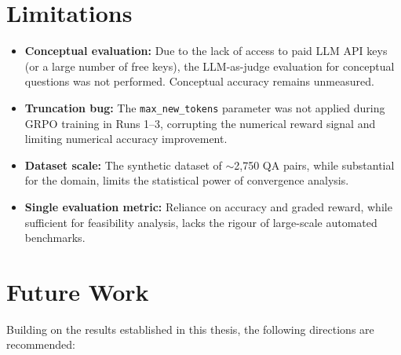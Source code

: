 \documentclass[12pt]{report}
\begin{document}
\section{Limitations}

\begin{itemize}
    \item \textbf{Conceptual evaluation:} Due to the lack of access to paid LLM API keys (or a large number of free keys), the LLM-as-judge evaluation for conceptual questions was not performed. Conceptual accuracy remains unmeasured.
    
    \item \textbf{Truncation bug:} The \texttt{max\_new\_tokens} parameter was not applied during GRPO training in Runs 1--3, corrupting the numerical reward signal and limiting numerical accuracy improvement.
    
    \item \textbf{Dataset scale:} The synthetic dataset of $\sim$2,750 QA pairs, while substantial for the domain, limits the statistical power of convergence analysis.
    
    \item \textbf{Single evaluation metric:} Reliance on accuracy and graded reward, while sufficient for feasibility analysis, lacks the rigour of large-scale automated benchmarks.
\end{itemize}

\section{Future Work}

Building on the results established in this thesis, the following directions are recommended:
\end{document}
